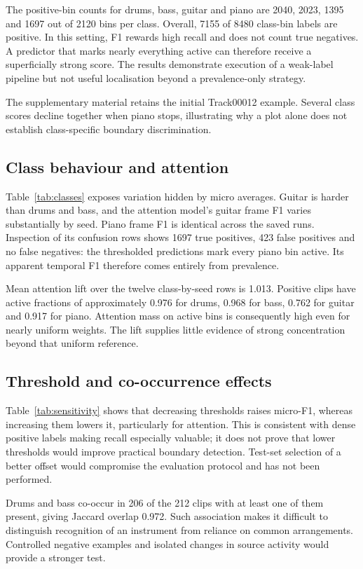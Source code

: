 \documentclass[10pt,a4paper]{article}
\begin{document}
The positive-bin counts for drums, bass, guitar and piano are 2040, 2023, 1395 and 1697 out of 2120 bins per class. Overall, 7155 of 8480 class-bin labels are positive. In this setting, F1 rewards high recall and does not count true negatives. A predictor that marks nearly everything active can therefore receive a superficially strong score. The results demonstrate execution of a weak-label pipeline but not useful localisation beyond a prevalence-only strategy.

The supplementary material retains the initial Track00012 example. Several class scores decline together when piano stops, illustrating why a plot alone does not establish class-specific boundary discrimination.

\subsection{Class behaviour and attention}

Table~\ref{tab:classes} exposes variation hidden by micro averages. Guitar is harder than drums and bass, and the attention model's guitar frame F1 varies substantially by seed. Piano frame F1 is identical across the saved runs. Inspection of its confusion rows shows 1697 true positives, 423 false positives and no false negatives: the thresholded predictions mark every piano bin active. Its apparent temporal F1 therefore comes entirely from prevalence.

Mean attention lift over the twelve class-by-seed rows is 1.013. Positive clips have active fractions of approximately 0.976 for drums, 0.968 for bass, 0.762 for guitar and 0.917 for piano. Attention mass on active bins is consequently high even for nearly uniform weights. The lift supplies little evidence of strong concentration beyond that uniform reference.

\subsection{Threshold and co-occurrence effects}

Table~\ref{tab:sensitivity} shows that decreasing thresholds raises micro-F1, whereas increasing them lowers it, particularly for attention. This is consistent with dense positive labels making recall especially valuable; it does not prove that lower thresholds would improve practical boundary detection. Test-set selection of a better offset would compromise the evaluation protocol and has not been performed.

Drums and bass co-occur in 206 of the 212 clips with at least one of them present, giving Jaccard overlap 0.972. Such association makes it difficult to distinguish recognition of an instrument from reliance on common arrangements. Controlled negative examples and isolated changes in source activity would provide a stronger test.
\end{document}
